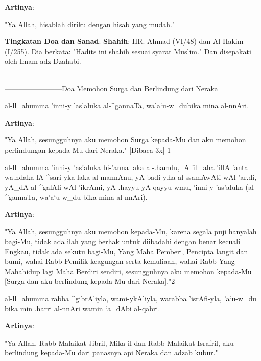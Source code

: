 \documentclass[a4paper,12pt]{article}
\begin{document}
\noindent
\textbf{Artinya}:
\par
\indent
"Ya Allah, hisablah diriku dengan hisab yang mudah."\\
\par
\noindent
\textbf{Tingkatan Doa dan Sanad}: \textbf{Shahih}: HR. Ahmad (VI/48) dan 
Al-Hakim (I/255).  Dia berkata: "Hadits ini shahih sesuai syarat Muslim." 
Dan disepakati oleh Imam adz-Dzahabi.\\\\
\par
{}------------------------Doa Memohon Surga dan Berlindung dari Neraka
\begin{arabtext}
\noindent
al-ll_ahumma 'inni-y 'as'aluka al-^gannaTa, wa'a`u-w_dubika mina al-nnAri.
\\
\end{arabtext}
\noindent
\textbf{Artinya}:
\par
\indent
"Ya Allah, sesungguhnya aku memohon Surga kepada-Mu dan aku memohon 
perlindungan kepada-Mu dari Neraka." [Dibaca 3x] {\scriptsize 1}\\
\begin{arabtext}
\noindent
al-ll_ahumma 'inni-y 'as'aluka bi-'anna laka al-.hamdu, lA 'il_aha 'illA 
'anta wa.hdaka lA ^sari-yka laka al-mannAnu, yA badi-y.ha al-ssamAwAti 
wAl-'ar.di, yA_dA al-^galAli wAl-'ikrAmi, yA .hayyu yA qayyu-wmu, 'inni-y 
'as'aluka (al-^gannaTa, wa'a`u-w_du bika mina al-nnAri).\\
\end{arabtext}
\noindent
\textbf{Artinya}:
\par
\indent
"Ya Allah, sesungguhnya aku memohon kepada-Mu, karena segala puji hanyalah 
bagi-Mu, tidak ada ilah yang berhak untuk diibadahi dengan benar kecuali 
Engkau, tidak ada sekutu bagi-Mu, Yang Maha Pemberi, Pencipta langit dan 
bumi, wahai Rabb Pemilik keagungan serta kemuliaan, wahai Rabb Yang 
Mahahidup lagi Maha Berdiri sendiri, sesungguhnya aku memohon kepada-Mu 
[Surga dan aku berlindung kepada-Mu dari Neraka]."{\scriptsize 2}\\
\begin{arabtext}
\noindent
al-ll_ahumma rabba ^gibrA'iyla, wami-ykA'iyla, warabba 'isrAfi-yla, 
'a`u-w_du bika min .harri al-nnAri wamin `a_dAbi al-qabri.\\
\end{arabtext}
\noindent
\textbf{Artinya}:
\par
\indent
"Ya Allah, Rabb Malaikat Jibril, Mika-il dan Rabb Malaikat Israfril, aku 
berlindung kepada-Mu dari panasnya api Neraka dan adzab kubur."
\end{document}
